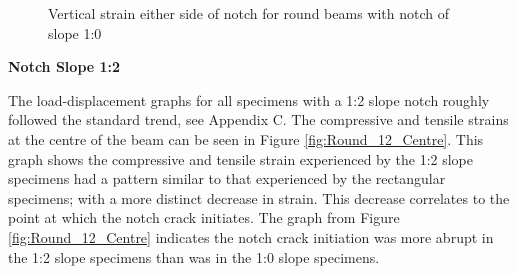 \documentclass[11pt,a4paper]{article}
\numberwithin{equation}{subsection}
\begin{document}
\vspace*{\baselineskip}

\begin{figure}[h]
	\begin{center}
	\end{center}
	\caption{Vertical strain either side of notch for round beams with notch of slope 1:0}
	\label{fig:Round_10_Y}
\end{figure}

\pagebreak

\noindent
\textbf{Notch Slope 1:2}\par
\noindent
The load-displacement graphs for all specimens with a 1:2 slope notch roughly followed the standard trend, see Appendix C. The compressive and tensile strains at the centre of the beam can be seen in Figure \ref{fig:Round_12_Centre}. This graph shows the compressive and tensile strain experienced by the 1:2 slope specimens had a pattern similar to that experienced by the rectangular specimens; with a more distinct decrease in strain. This decrease correlates to the point at which the notch crack initiates. The graph from Figure \ref{fig:Round_12_Centre} indicates the notch crack initiation was more abrupt in the 1:2 slope specimens than was in the 1:0 slope specimens.
\end{document}
